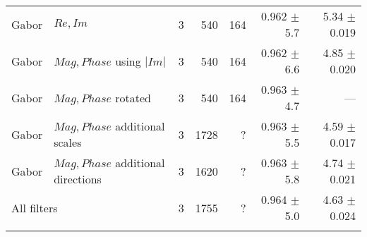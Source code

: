 \begin{tabularx}{\linewidth}{p{3cm} p{3cm} r r r r r}
Gabor   & $Re,Im$                   & 3 &    540    &164     & 0.962 $\pm$ 5.7   & 5.34 $\pm$ 0.019 \\

Gabor   & $Mag,Phase$ using $|Im|$  & 3 &    540    &164     & 0.962 $\pm$ 6.6     & 4.85 $\pm$  0.020 \\

Gabor   & $Mag,Phase$ rotated       & 3 &    540    &164     & 0.963 $\pm$ 4.7     & --- \\

Gabor   & $Mag,Phase$ additional scales  
                                    & 3 &   1728    &?       & 0.963 $\pm$ 5.5     & 4.59 $\pm$ 0.017 \\
Gabor   & $Mag,Phase$ additional directions
                                    & 3 &   1620    &?       & 0.963 $\pm$ 5.8     & 4.74 $\pm$ 0.021 \\


\multicolumn{2}{l}{All filters}     & 3 &   1755    &?       & 0.964 $\pm$ 5.0     & 4.63 $\pm$ 0.024 \\

\bottomrule
\noalign{\smallskip}
\end{tabularx}
